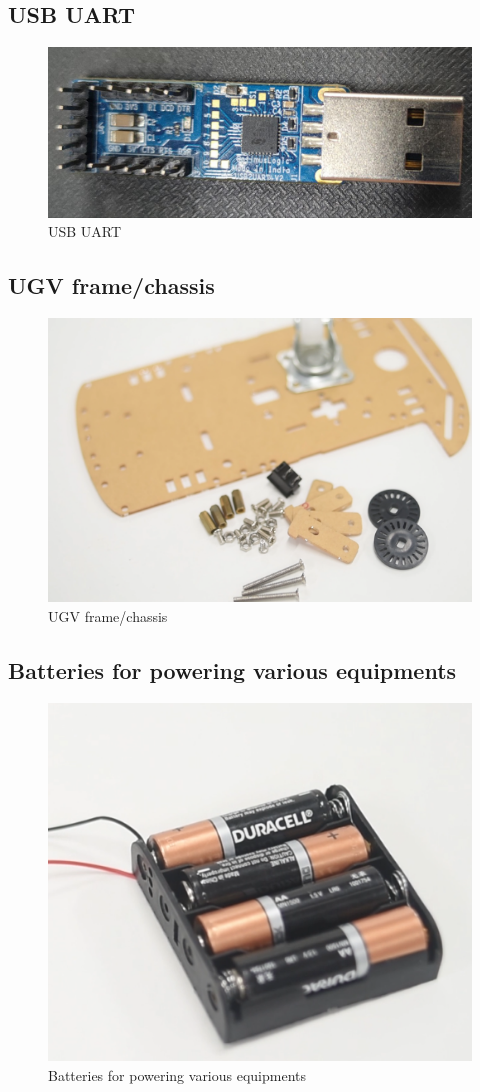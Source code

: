 \begin{enumerate}[label=\thesection.\arabic*.,ref=\thesection.\theenumi]
\subsection{USB UART}
\begin{figure}[H]
\centering
\includegraphics[width=0.5\columnwidth]{figs/uart.jpg}
\caption{USB UART}
\end{figure}
\subsection{UGV frame/chassis}
\begin{figure}[H]
\centering
\includegraphics[width=0.5\columnwidth]{figs/base.png}
\caption{UGV frame/chassis}
\end{figure}


\subsection{Batteries for powering various equipments}
\begin{figure}[H]
\centering
\includegraphics[width=0.5\columnwidth]{figs/battery.png}
\caption{Batteries for powering various equipments}
\end{figure}


\end{enumerate}
